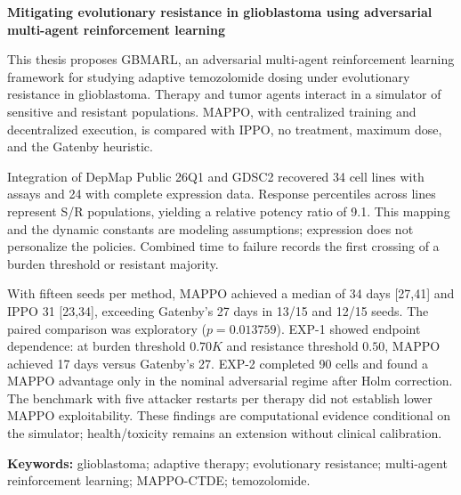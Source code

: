 
\begin{center}
\large \vspace{-1.5cm} \textbf{Mitigating evolutionary resistance in glioblastoma using adversarial multi-agent reinforcement learning}
\end{center}

This thesis proposes GBMARL, an adversarial multi-agent reinforcement learning framework for studying adaptive temozolomide dosing under evolutionary resistance in glioblastoma. Therapy and tumor agents interact in a simulator of sensitive and resistant populations. MAPPO, with centralized training and decentralized execution, is compared with IPPO, no treatment, maximum dose, and the Gatenby heuristic.

Integration of DepMap Public 26Q1 and GDSC2 recovered 34 cell lines with assays and 24 with complete expression data. Response percentiles across lines represent S/R populations, yielding a relative potency ratio of 9.1. This mapping and the dynamic constants are modeling assumptions; expression does not personalize the policies. Combined time to failure records the first crossing of a burden threshold or resistant majority.

With fifteen seeds per method, MAPPO achieved a median of 34 days [27,41] and IPPO 31 [23,34], exceeding Gatenby's 27 days in 13/15 and 12/15 seeds. The paired comparison was exploratory ($p=0.013759$). EXP-1 showed endpoint dependence: at burden threshold $0.70K$ and resistance threshold $0.50$, MAPPO achieved 17 days versus Gatenby's 27. EXP-2 completed 90 cells and found a MAPPO advantage only in the nominal adversarial regime after Holm correction. The benchmark with five attacker restarts per therapy did not establish lower MAPPO exploitability. These findings are computational evidence conditional on the simulator; health/toxicity remains an extension without clinical calibration.

\noindent \textbf{Keywords:} glioblastoma; adaptive therapy; evolutionary resistance; multi-agent reinforcement learning; MAPPO-CTDE; temozolomide.
